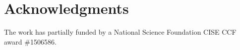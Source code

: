 \documentclass[final,twocolumn]{elsarticle}
\theoremstyle{break}
\begin{document}
\section*{Acknowledgments}
The work has partially funded by a National Science Foundation CISE CCF award \#1506586.
 
\vspace*{0.5mm}
 
 
% 

  

   



 
    
\end{document}
